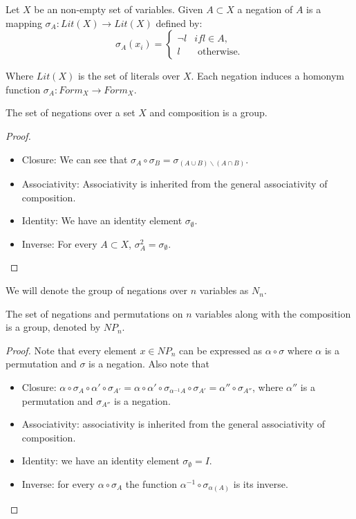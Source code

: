 \begin{definition}
  Let $X$ be an non-empty set of variables. Given $A\subset X$ a negation of $A$ is a mapping $\sigma_{A}:Lit(X) \to Lit(X)$ defined by:
  $$
\sigma_{A}(x_{i})=
\begin{cases}
  \neg l & if l \in A, \\
  l & \text{ otherwise}.
\end{cases}
$$

Where $Lit(X)$ is the set of literals over $X$. Each negation induces a homonym function $\sigma_{A}:Form_{X}\to Form_{X}$.
\end{definition}

\begin{proposition}
  The set of negations over a set $X$ and composition is a group.
\end{proposition}
\begin{proof}\hfill 
  \begin{itemize}
    \item Closure: We can see that $\sigma_{A}\circ\sigma_{B} = \sigma_{(A\cup B)\backslash (A\cap B)}$.
    \item Associativity: Associativity is inherited from the general associativity of composition.
    \item Identity: We have an identity element $\sigma_{\emptyset}$.
    \item Inverse: For every $A\subset X$, $\sigma_{A}^2 = \sigma_{\emptyset}$.
  \end{itemize}
\end{proof}

We will denote the group of negations over $n$ variables as $N_n$.

\begin{proposition}[$NP_n$]
  The set of negations and permutations on $n$ variables  along with the composition is a group, denoted by $NP_n$. 
\end{proposition}
\begin{proof}
  Note that every element $x\in NP_n$ can be expressed as $\alpha\circ \sigma$ where $\alpha$ is a permutation and $\sigma$ is a negation. Also note that 
  \begin{itemize}
    \item Closure: $\alpha\circ \sigma_{A} \circ \alpha'\circ \sigma_{A'} = \alpha \circ \alpha' \circ \sigma_{\alpha^{-1} A} \circ \sigma_{A'}  = \alpha''\circ \sigma_{A''}$, where $\alpha''$ is a permutation and $\sigma_{A''}$ is a negation.
    \item Associativity: associativity is inherited from the general associativity of composition.
    \item Identity: we have an identity element $\sigma_{\emptyset}=I$.
    \item Inverse: for every $\alpha \circ \sigma_A$ the function $\alpha^{-1}\circ \sigma_{\alpha(A)}$ is its inverse.
  \end{itemize}
\end{proof}

